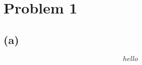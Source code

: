 \documentclass[a4paper]{article}
\begin{document}
\section*{Problem 1}
\subsection*{(a)}


\begin{equation}
hello
\end{equation}
\end{document}
